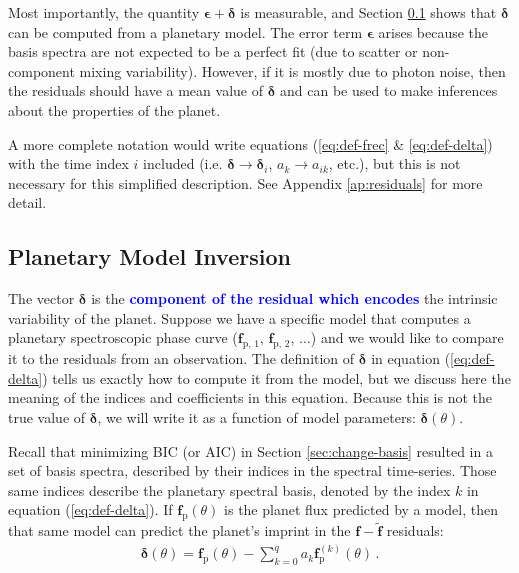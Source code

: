 \documentclass[twocolumn,linenumbers]{aastex7}
\newcommand{\update}[1]{\textcolor{blue}{\bf #1}}
\begin{document}
Most importantly, the quantity $\bm{\epsilon} + \bm{\delta}$ is measurable, and Section \ref{sec:compute-delta} shows that $\bm{\delta}$ can be computed from a planetary model. The error term $\bm{\epsilon}$ arises because the basis spectra are not expected to be a perfect fit (due to scatter or non-component mixing variability). However, if it is mostly due to photon noise, then the residuals should have a mean value of $\bm{\delta}$ and can be used to make inferences about the properties of the planet.

A more complete notation would write equations (\ref{eq:def-frec} \& \ref{eq:def-delta}) with the time index $i$ included (i.e. $\bm{\delta}\rightarrow\bm{\delta}_i$, $a_k\rightarrow a_{ik}$, etc.), but this is not necessary for this simplified description. See Appendix \ref{ap:residuals} for more detail.

\subsection{Planetary Model Inversion}\label{sec:compute-delta}

The vector $\bm{\delta}$ is the \update{component of the residual which encodes} the intrinsic variability of the planet. Suppose we have a specific model that computes a planetary spectroscopic phase curve ($\bm{f}_{\text{p},\,1},\, \bm{f}_{\text{p},\,2},\,\dots$) and we would like to compare it to the residuals from an observation. The definition of $\bm{\delta}$ in equation (\ref{eq:def-delta}) tells us exactly how to compute it from the model, but we discuss here the meaning of the indices and coefficients in this equation. Because this is not the true value of $\bm{\delta}$, we will write it as a function of model parameters: $\bm{\delta}(\theta)$.

Recall that minimizing BIC (or AIC) in Section \ref{sec:change-basis} resulted in a set of basis spectra, described by their indices in the spectral time-series. Those same indices describe the planetary spectral basis, denoted by the index $k$ in equation (\ref{eq:def-delta}). If $\bm{f}_\mathrm{p}(\theta)$ is the planet flux predicted by a model, then that same model can predict the planet's imprint in the $\bm{f}-\tilde{\bm{f}}$ residuals:
\begin{align} \label{eq:model-residual}
    \bm{\delta}(\theta) = \bm{f}_\mathrm{p}(\theta) - \sum_{k=0}^q a_k \bm{f}_\mathrm{p}^{(k)}(\theta)\, .
\end{align}
\end{document}
